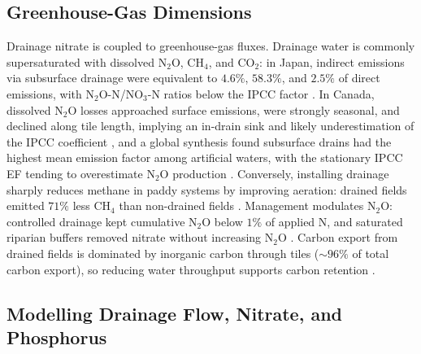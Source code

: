 \documentclass[11pt]{article}
\begin{document}
\subsection{Greenhouse-Gas Dimensions}

Drainage nitrate is coupled to greenhouse-gas fluxes. Drainage water is
commonly supersaturated with dissolved N$_2$O, CH$_4$, and CO$_2$: in Japan,
indirect emissions via subsurface drainage were equivalent to $4.6\%$,
$58.3\%$, and $2.5\%$ of direct emissions, with N$_2$O-N/NO$_3$-N ratios below
the IPCC factor \parencite{Sawamoto2003,Minamikawa2010,Minamikawa2013}. In
Canada, dissolved N$_2$O losses approached surface emissions, were strongly
seasonal, and declined along tile length, implying an in-drain sink and likely
underestimation of the IPCC coefficient \parencite{Burton2024}, and a global
synthesis found subsurface drains had the highest mean emission factor among
artificial waters, with the stationary IPCC EF tending to overestimate N$_2$O
production \parencite{Webb2021}. Conversely, installing drainage sharply
reduces methane in paddy systems by improving aeration: drained fields emitted
$71\%$ less CH$_4$ than non-drained fields \parencite{Shiratori2007,Furukawa2008}.
Management modulates N$_2$O: controlled drainage kept cumulative N$_2$O below
$1\%$ of applied N, and saturated riparian buffers removed nitrate without
increasing N$_2$O \parencite{Smith2019,Davis2019,Nash2015e,Carstensen2021}.
Carbon export from drained fields is dominated by inorganic carbon through
tiles ($\sim96\%$ of total carbon export), so reducing water throughput
supports carbon retention \parencite{Schilling2023,Driscoll2025}.

\subsection{Modelling Drainage Flow, Nitrate, and Phosphorus}
\end{document}

